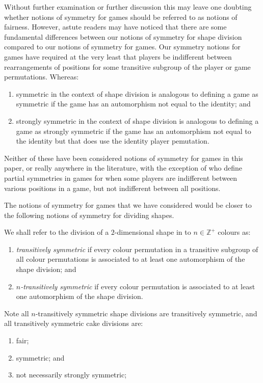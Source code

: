 Without further examination or further discussion this may leave one doubting whether notions of symmetry for games should be referred to as notions of fairness. However, astute readers may have noticed that there are some fundamental differences between our notions of symmetry for shape division compared to our notions of symmetry for games. Our symmetry notions for games have required at the very least that players be indifferent between rearrangements of positions for some transitive subgroup of the player or game permutations. Whereas:
\begin{enumerate}
	\item symmetric in the context of shape division is analogous to defining a game as symmetric if the game has an automorphism not equal to the identity; and
	\item strongly symmetric in the context of shape division is analogous to defining a game as strongly symmetric if the game has an automorphism not equal to the identity but that does use the identity player pemutation.
\end{enumerate}

Neither of these have been considered notions of symmetry for games in this paper, or really anywhere in the literature, with the exception of \cite{ViglizzoarXiv} who define partial symmetries in games for when some players are indifferent between various positions in a game, but not indifferent between all positions. 

The notions of symmetry for games that we have considered would be closer to the following notions of symmetry for dividing shapes. 

\begin{definition}
	We shall refer to the division of a $2$-dimensional shape in to $n \in \mathbb{Z}^+$ colours as:
	\begin{enumerate}
		\item \textit{transitively symmetric} if every colour permutation in a transitive subgroup of all colour permutations is associated to at least one automorphism of the shape division; and
		\item \textit{$n$-transitively symmetric} if every colour permutation is associated to at least one automorphism of the shape division.
	\end{enumerate}
\end{definition}

Note all $n$-transitively symmetric shape divisions are transitively symmetric, and all transitively symmetric cake divisions are:
\begin{enumerate}
	\item fair;
	\item symmetric; and
	\item not necessarily strongly symmetric;
\end{enumerate}

